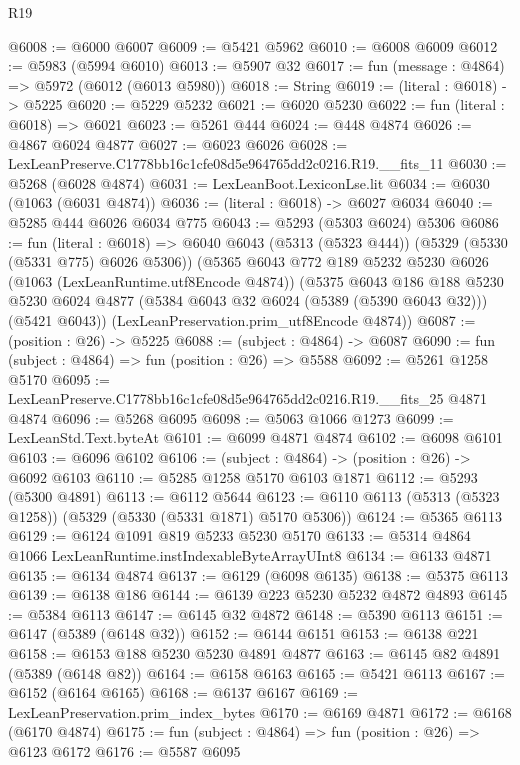 \begin{lexlean}{R19}
\begin{coremodule}
@6008 := @6000 @6007
@6009 := @5421 @5962
@6010 := @6008 @6009
@6012 := @5983 (@5994 @6010)
@6013 := @5907 @32
@6017 := fun (message : @4864) => @5972 (@6012 (@6013 @5980))
@6018 := String
@6019 := (literal : @6018) -> @5225
@6020 := @5229 @5232
@6021 := @6020 @5230
@6022 := fun (literal : @6018) => @6021
@6023 := @5261 @444
@6024 := @448 @4874
@6026 := @4867 @6024 @4877
@6027 := @6023 @6026
@6028 := LexLeanPreserve.C1778bb16c1cfe08d5e964765dd2c0216.R19.__fits_11
@6030 := @5268 (@6028 @4874)
@6031 := LexLeanBoot.LexiconLse.lit
@6034 := @6030 (@1063 (@6031 @4874))
@6036 := (literal : @6018) -> @6027 @6034
@6040 := @5285 @444 @6026 @6034 @775
@6043 := @5293 (@5303 @6024) @5306
@6086 := fun (literal : @6018) =>
  @6040
    @6043
    (@5313 (@5323 @444))
    (@5329 (@5330 (@5331 @775) @6026 @5306))
    (@5365
      @6043
      @772
      @189
      @5232
      @5230
      @6026
      (@1063 (LexLeanRuntime.utf8Encode @4874))
      (@5375
        @6043
        @186
        @188
        @5230
        @5230
        @6024
        @4877
        (@5384 @6043 @32 @6024 (@5389 (@5390 @6043 @32)))
        (@5421 @6043))
      (LexLeanPreservation.prim_utf8Encode @4874))
@6087 := (position : @26) -> @5225
@6088 := (subject : @4864) -> @6087
@6090 := fun (subject : @4864) => fun (position : @26) => @5588
@6092 := @5261 @1258 @5170
@6095 := LexLeanPreserve.C1778bb16c1cfe08d5e964765dd2c0216.R19.__fits_25 @4871 @4874
@6096 := @5268 @6095
@6098 := @5063 @1066 @1273
@6099 := LexLeanStd.Text.byteAt
@6101 := @6099 @4871 @4874
@6102 := @6098 @6101
@6103 := @6096 @6102
@6106 := (subject : @4864) -> (position : @26) -> @6092 @6103
@6110 := @5285 @1258 @5170 @6103 @1871
@6112 := @5293 (@5300 @4891)
@6113 := @6112 @5644
@6123 := @6110 @6113 (@5313 (@5323 @1258)) (@5329 (@5330 (@5331 @1871) @5170 @5306))
@6124 := @5365 @6113
@6129 := @6124 @1091 @819 @5233 @5230 @5170
@6133 := @5314 @4864 @1066 LexLeanRuntime.instIndexableByteArrayUInt8
@6134 := @6133 @4871
@6135 := @6134 @4874
@6137 := @6129 (@6098 @6135)
@6138 := @5375 @6113
@6139 := @6138 @186
@6144 := @6139 @223 @5230 @5232 @4872 @4893
@6145 := @5384 @6113
@6147 := @6145 @32 @4872
@6148 := @5390 @6113
@6151 := @6147 (@5389 (@6148 @32))
@6152 := @6144 @6151
@6153 := @6138 @221
@6158 := @6153 @188 @5230 @5230 @4891 @4877
@6163 := @6145 @82 @4891 (@5389 (@6148 @82))
@6164 := @6158 @6163
@6165 := @5421 @6113
@6167 := @6152 (@6164 @6165)
@6168 := @6137 @6167
@6169 := LexLeanPreservation.prim_index_bytes
@6170 := @6169 @4871
@6172 := @6168 (@6170 @4874)
@6175 := fun (subject : @4864) => fun (position : @26) => @6123 @6172
@6176 := @5587 @6095

\end{coremodule}
\end{lexlean}
